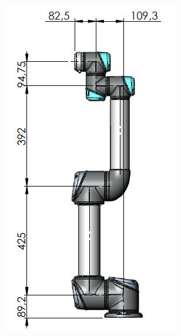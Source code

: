 \begin{minipage}{0.34\textwidth}
		\includegraphics[width=\textwidth]{UR_dimensions}	
\end{minipage}


